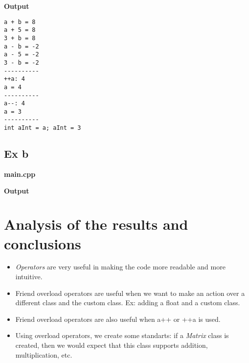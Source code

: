 \documentclass{article}
\begin{document}
			\begin{minipage}{\textwidth}
				\begin{center}
					\textbf{Output}
				\end{center}

				\begin{lstlisting}
a + b = 8
a + 5 = 8
3 + b = 8
a - b = -2
a - 5 = -2
3 - b = -2
----------
++a: 4
a = 4
----------
a--: 4
a = 3
----------
int aInt = a; aInt = 3
				\end{lstlisting}
			\end{minipage}
			\pagebreak

		\subsection{Ex b}
			
			\clearpage

			\begin{samepage}
				\begin{center}
					\textbf{main.cpp}
				\end{center}

				
			\end{samepage}

			\centering

			\begin{samepage}
				\begin{center}
					\textbf{Output}
				\end{center}

				
			\end{samepage}
			\pagebreak

	\section{Analysis of the results and conclusions}
		\begin{itemize}
			\item \textit{Operators} are very useful in making the code more readable and more intuitive.

			\item Friend overload operators are useful when we want to make an action over a different class and the custom class. Ex: adding a float and a custom class.

			\item Friend overload operators are also useful when a++ or ++a is used.

			\item Using overload operators, we create some standarts: if a \textit{Matrix} class is created, then we would expect that this class supports addition, multiplication, etc.
		\end{itemize}
\end{document}
